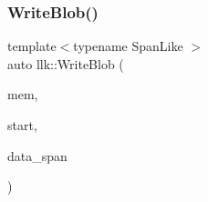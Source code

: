 \subsubsection{\texorpdfstring{Write\+Blob()}{WriteBlob()}\hspace{0.1cm}{\footnotesize\ttfamily [2/2]}}
{\footnotesize\ttfamily template$<$typename Span\+Like $>$ \\
auto llk\+::\+Write\+Blob (\begin{DoxyParamCaption}\item[{\hyperlink{classllk_1_1memory}{memory} \&}]{mem,  }\item[{\hyperlink{classllk_1_1memory_ae7a4b897aa999f22e250dc8e4d773dec}{memory\+::address\+\_\+t}}]{start,  }\item[{const Span\+Like \&}]{data\+\_\+span }\end{DoxyParamCaption})}

